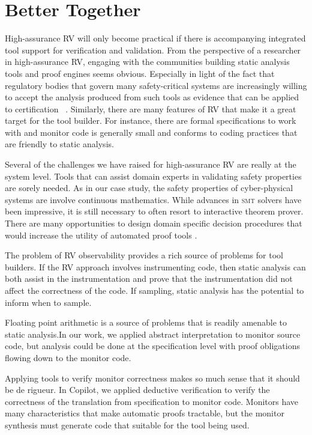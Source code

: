 \section{Better Together}\label{sec:oportunities} 
High-assurance RV will only become practical if there is accompanying
integrated tool support for verification and validation.  From the
perspective of a researcher in high-assurance RV, engaging with the
communities building static analysis tools and proof engines seems
obvious.  Especially in light of the fact that regulatory bodies that
govern many safety-critical systems are increasingly willing to accept
the analysis produced from such tools as evidence that can be applied to
certification ~\cite{DO333}. Similarly, there are many features of RV
that make it a great target for the tool builder. For instance, there are formal
specifications to work with  and monitor code is generally small and
conforms to coding practices that are friendly to static analysis. 

 
Several of the challenges we have raised for high-assurance RV are
really at the system level. Tools that can assist domain experts in
validating safety properties are sorely needed.  As in our case study,
the safety properties of cyber-physical systems are involve continuous
mathematics. While advances in \textsc{smt} solvers have been
impressive, it is still necessary to often resort to interactive
theorem prover. There are many opportunities to design
domain specific decision procedures that would increase the utility of
automated proof
tools .  

The problem of RV observability provides a rich source of problems for tool builders. If the RV
approach involves instrumenting code, then static analysis can both
assist in the instrumentation and prove that the instrumentation did
not affect the correctness of the code. If sampling, static analysis
has the potential to inform when to sample.

Floating point arithmetic
is a source of problems that is readily amenable to static analysis.In
our work, we applied abstract interpretation to monitor source code,
but  analysis could be done at the specification level with
proof obligations flowing down to the monitor code. 

Applying tools to verify monitor correctness makes so much sense that
it should be de rigueur.  In Copilot, we applied deductive
verification to verify the correctness of the translation from
specification to monitor code.  Monitors have many characteristics
that make automatic proofs tractable, but the monitor synthesis must
generate code that suitable for the tool being used.   